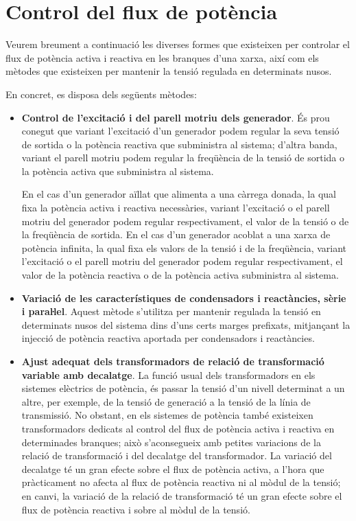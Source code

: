 \section{Control del flux de potència} \label{sec:control-flux-pot}

Veurem breument a continuació les diverses formes que existeixen
per controlar el flux de potència activa i reactiva en les branques
d'una xarxa, així com els mètodes que existeixen per mantenir la
tensió regulada en determinats nusos.

En concret, es disposa dels següents mètodes:

\begin{itemize}
   \item \textbf{Control de l'excitació i del parell motriu dels generador}. És prou conegut
    que variant l'excitació d'un generador podem regular la seva tensió de sortida o
        la potència reactiva que subministra al sistema; d'altra banda, variant el parell motriu
    podem regular la freqüència de la tensió de sortida o la potència activa que subministra al sistema.

    En el cas d'un generador aïllat que alimenta a una càrrega
    donada, la qual fixa la potència activa i reactiva necessàries, variant
     l'excitació o el parell motriu del
    generador podem regular respectivament, el valor de la tensió
    o de la freqüència de sortida. En el cas d'un generador acoblat a una xarxa de potència
    infinita, la qual fixa els valors de la tensió i de la freqüència, variant l'excitació o el parell motriu del
    generador podem regular respectivament, el valor de la potència reactiva o de la potència
    activa  subministra al sistema.

   \item \textbf{Variació de les característiques de condensadors i reactàncies, sèrie
    i paraŀlel}. Aquest mètode s'utilitza per mantenir regulada la tensió en determinats
     nusos del sistema dins d'uns certs marges prefixats, mitjançant la injecció  de potència
      reactiva aportada per condensadors i reactàncies.

   \item \textbf{Ajust adequat dels transformadors de relació de transformació variable amb
    decalatge}. La funció usual dels transformadors en els sistemes elèctrics de potència,
    és passar la tensió d'un nivell determinat a un altre, per exemple, de la tensió de generació
    a la tensió de la línia de transmissió. No obstant, en els sistemes de potència també existeixen
    transformadors dedicats al control del flux de potència activa i reactiva en determinades
    branques; això s'aconsegueix amb petites variacions de la relació de transformació i del
    decalatge del transformador. La variació del decalatge té un gran efecte sobre el flux
    de potència activa, a l'hora que pràcticament no afecta al flux de potència reactiva ni al
    mòdul de la tensió; en canvi, la variació de la relació de transformació té un gran efecte
    sobre el flux de potència reactiva i sobre al mòdul de la tensió.
\end{itemize}

